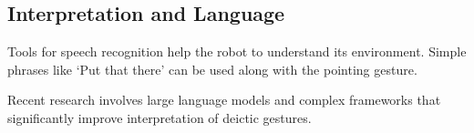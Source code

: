 \subsection{Interpretation and Language}
Tools for speech recognition help the robot to understand its environment. Simple phrases like ‘Put that there’ can be used along with the pointing gesture.\cite{TT_2020}\par
Recent research involves large language models and complex frameworks that significantly improve interpretation of deictic gestures.\cite{GIRAF} \par


